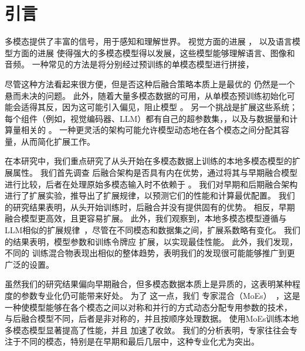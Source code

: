 \section{引言}
\label{sec:intro}

多模态提供了丰富的信号，用于感知和理解世界。
视觉方面的进展
\citep{radford2021learning,oquab2023dinov2,zhai2023sigmoidsiglip,fini2024multimodalaimv2}， 
以及语言模型方面的进展 \citep{achiam2023gpt4,team2023gemini,dubey2024llama3} 
使得强大的多模态模型得以发展，这些模型能够理解语言、图像和音频。 
一种常见的方法是将分别经过预训练的单模态模型进行拼接，

尽管这种方法看起来很方便，但是否这种后融合策略本质上是最优的  仍然是一个悬而未决的问题。 
此外，随着大量多模态数据的可用，从单模态预训练初始化可能会适得其反，因为这可能引入偏见，阻止模型 。 
另一个挑战是扩展这些系统；每个组件（例如，视觉编码器、LLM）都有自己的超参数集，，以及与数据量和计算量相关的 。 
一种更灵活的架构可能允许模型动态地在各个模态之间分配其容量，从而简化扩展工作。

在本研究中，我们重点研究了从头开始在多模态数据上训练的本地多模态模型的扩展属性。 
我们首先调查  后融合架构是否具有内在优势，通过将其与早期融合模型进行比较，后者在处理原始多模态输入时不依赖于 。
我们对早期和后期融合架构进行了扩展实验，推导出了扩展规律，以预测它们的性能和计算最优配置。
我们的研究结果表明，从头开始训练时，后融合并没有提供固有的优势。 相反，早期融合模型更高效，且更容易扩展。 
此外，我们观察到，本地多模态模型遵循与LLM相似的扩展规律~\citep{hoffmann2022training}，尽管在不同模态和数据集之间，扩展系数略有变化。 
我们的结果表明，模型参数和训练令牌应  扩展，以实现最佳性能。 
此外，我们发现，不同的  训练混合物表现出相似的整体趋势，表明我们的发现很可能能够推广到更广泛的设置。

虽然我们的研究结果偏向早期融合，但多模态数据本质上是异质的，这表明某种程度的参数专业化仍可能带来好处。 
为了  这一点，我们  专家混合（MoEs）~\citep{shazeer2017outrageously}，这是一种使模型能够在各个模态之间以对称和并行的方式动态分配专用参数的技术， 
与后融合模型不同，后者是非对称的，并且按顺序处理数据。 
使用MoEs训练本地多模态模型显著提高了性能，并且  加速了收敛。 
我们的分析表明，专家往往会专注于不同的模态，特别是在早期和最后几层中，这种专业化尤为突出。

